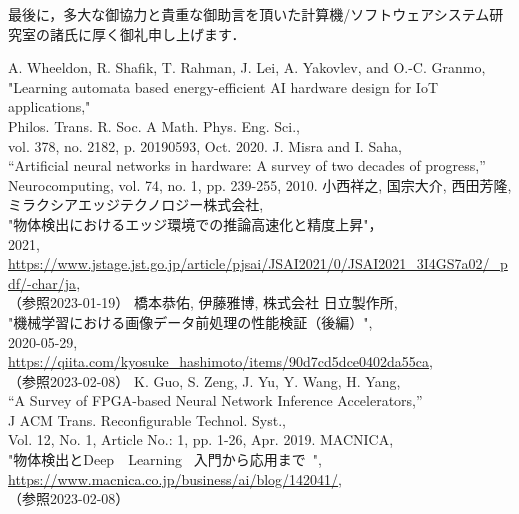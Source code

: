 \documentclass[11pt,a4j]{jreport}
\begin{document}
最後に，多大な御協力と貴重な御助言を頂いた計算機/ソフトウェアシステム研究室の諸氏に厚く御礼申し上げます．
\renewcommand{\bibname}{参考文献} %
\begin{thebibliography}{99}
   A. Wheeldon, R. Shafik, T. Rahman, J. Lei, A. Yakovlev, and O.-C. Granmo, \\"Learning automata based energy-efficient AI hardware design for IoT applications," \\Philos. Trans. R. Soc. A Math. Phys. Eng. Sci., \\vol. 378, no. 2182, p. 20190593, Oct. 2020. 
  J. Misra and I. Saha, \\“Artificial neural networks in hardware: A survey of two decades of progress,” \\Neurocomputing, vol. 74, no. 1, pp. 239-255, 2010.
   小西祥之, 国宗大介, 西田芳隆, ミラクシアエッジテクノロジー株式会社, \\"物体検出におけるエッジ環境での推論高速化と精度上昇"， \\2021, \\\url{https://www.jstage.jst.go.jp/article/pjsai/JSAI2021/0/JSAI2021_3I4GS7a02/_pdf/-char/ja}, \\（参照2023-01-19）
   橋本恭佑, 伊藤雅博, 株式会社 日立製作所, \\ "機械学習における画像データ前処理の性能検証（後編）", \\2020-05-29, \\\url{https://qiita.com/kyosuke_hashimoto/items/90d7cd5dce0402da55ca}, \\ （参照2023-02-08） 
   K. Guo, S. Zeng, J. Yu, Y. Wang, H. Yang, \\“A Survey of FPGA-based Neural Network Inference Accelerators,” \\J ACM Trans. Reconfigurable Technol. Syst., \\Vol. 12, No. 1, Article No.: 1, pp. 1-26, Apr. 2019. 
   MACNICA, \\"物体検出とDeep　Learning ~入門から応用まで~", \\\url{https://www.macnica.co.jp/business/ai/blog/142041/}, \\（参照2023-02-08） 

\end{thebibliography}
\end{document}
